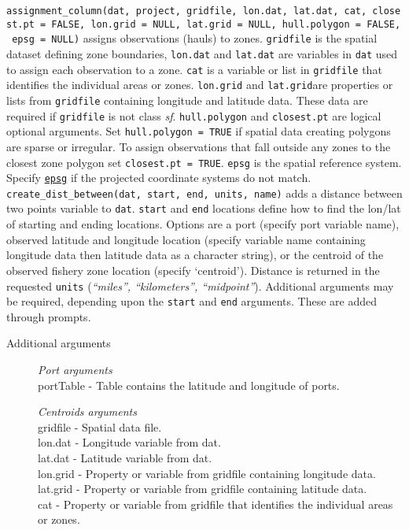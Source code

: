 \documentclass[
]{article}
\begin{document}
\texttt{assignment\_column(dat,\ project,\ gridfile,\ lon.dat,\ lat.dat,\ cat,\ closest.pt\ =\ FALSE,\ lon.grid\ =\ NULL,\ lat.grid\ =\ NULL,\ hull.polygon\ =\ FALSE,\ epsg\ =\ NULL)} assigns observations (hauls) to zones. \texttt{gridfile} is the spatial dataset defining zone boundaries, \texttt{lon.dat} and \texttt{lat.dat} are variables in \texttt{dat} used to assign each observation to a zone. \texttt{cat} is a variable or list in \texttt{gridfile} that identifies the individual areas or zones. \texttt{lon.grid} and \texttt{lat.grid}are properties or lists from \texttt{gridfile} containing longitude and latitude data. These data are required if \texttt{gridfile} is not class \emph{sf}. \texttt{hull.polygon} and \texttt{closest.pt} are logical optional arguments. Set \texttt{hull.polygon\ =\ TRUE} if spatial data creating polygons are sparse or irregular. To assign observations that fall outside any zones to the closest zone polygon set \texttt{closest.pt\ =\ TRUE}. \texttt{epsg} is the spatial reference system. Specify \href{http://spatialreference.org}{\texttt{epsg}} if the projected coordinate systems do not match.\\
\texttt{create\_dist\_between(dat,\ start,\ end,\ units,\ name)} adds a distance between two points variable to \texttt{dat}. \texttt{start} and \texttt{end} locations define how to find the lon/lat of starting and ending locations. Options are a port (specify port variable name), observed latitude and longitude location (specify variable name containing longitude data then latitude data as a character string), or the centroid of the observed fishery zone location (specify `centroid'). Distance is returned in the requested \texttt{units} (\emph{``miles'', ``kilometers'', ``midpoint''}).
Additional arguments may be required, depending upon the \texttt{start} and \texttt{end} arguments. These are added through prompts.

\begin{description}
\item[Additional arguments]
\emph{Port arguments}\\
portTable - Table contains the latitude and longitude of ports.

\emph{Centroids arguments}\\
gridfile - Spatial data file.\\
lon.dat - Longitude variable from dat.\\
lat.dat - Latitude variable from dat.\\
lon.grid - Property or variable from gridfile containing longitude data.\\
lat.grid - Property or variable from gridfile containing latitude data.\\
cat - Property or variable from gridfile that identifies the individual areas or zones.\\
\end{description}
\end{document}
